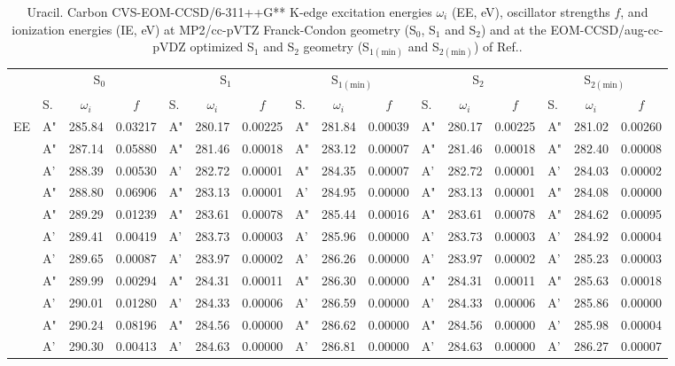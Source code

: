 \documentclass[journal=jctcce,manuscript=article]{achemso}
\begin{document}
\begin{table}
\caption{Uracil.  Carbon CVS-EOM-CCSD/6-311++G** K-edge excitation energies $\omega_i$ (EE, eV), oscillator strengths $f$, and ionization energies (IE, eV) at MP2/cc-pVTZ Franck-Condon geometry (S$_0$, S$_1$ and S$_2$) and at the EOM-CCSD/aug-cc-pVDZ optimized S$_1$ and S$_2$ geometry (S$_{1(\text{min})}$ and S$_{2(\text{min})}$) of Ref..
\label{Tab:Uracil}}
\scriptsize
\begin{tabular}{l|lcc|lcc|lcc|lcc|lcc}
\cline{2-16}
& \multicolumn{3}{c|}{S$_0$}
& \multicolumn{3}{c|}{S$_1$}  
& \multicolumn{3}{c|}{S$_{1(\text{min})}$}
& \multicolumn{3}{c|}{S$_2$}
& \multicolumn{3}{c}{S$_{2(\text{min})}$}
\\
\cline{2-16}
& S. & $\omega_i$ & $f$ 
& S. & $\omega_i$ & $f$ 
& S. & $\omega_i$ & $f$ 
& S. & $\omega_i$ & $f$ 
& S. & $\omega_i$ & $f$\\
\hline
  EE 
& A" & 285.84 & 0.03217 & A" & 280.17 & 0.00225 & A" & 281.84 & 0.00039 & A" & 280.17 & 0.00225 & A" & 281.02 & 0.00260 \\
& A" & 287.14 & 0.05880 & A" & 281.46 & 0.00018 & A" & 283.12 & 0.00007 & A" & 281.46 & 0.00018 & A" & 282.40 & 0.00008 \\
& A' & 288.39 & 0.00530 & A' & 282.72 & 0.00001 & A" & 284.35 & 0.00007 & A' & 282.72 & 0.00001 & A' & 284.03 & 0.00002 \\
& A" & 288.80 & 0.06906 & A" & 283.13 & 0.00001 & A' & 284.95 & 0.00000 & A" & 283.13 & 0.00001 & A" & 284.08 & 0.00000 \\
& A" & 289.29 & 0.01239 & A" & 283.61 & 0.00078 & A" & 285.44 & 0.00016 & A" & 283.61 & 0.00078 & A" & 284.62 & 0.00095 \\
& A' & 289.41 & 0.00419 & A' & 283.73 & 0.00003 & A' & 285.96 & 0.00000 & A' & 283.73 & 0.00003 & A' & 284.92 & 0.00004 \\
& A' & 289.65 & 0.00087 & A' & 283.97 & 0.00002 & A' & 286.26 & 0.00000 & A' & 283.97 & 0.00002 & A' & 285.23 & 0.00003 \\
& A" & 289.99 & 0.00294 & A" & 284.31 & 0.00011 & A" & 286.30 & 0.00000 & A" & 284.31 & 0.00011 & A" & 285.63 & 0.00018 \\
& A' & 290.01 & 0.01280 & A' & 284.33 & 0.00006 & A' & 286.59 & 0.00000 & A' & 284.33 & 0.00006 & A' & 285.86 & 0.00000 \\
& A" & 290.24 & 0.08196 & A" & 284.56 & 0.00000 & A" & 286.62 & 0.00000 & A" & 284.56 & 0.00000 & A' & 285.98 & 0.00004 \\
& A' & 290.30 & 0.00413 & A' & 284.63 & 0.00000 & A' & 286.81 & 0.00000 & A' & 284.63 & 0.00000 & A' & 286.27 & 0.00007 \\

\end{tabular}
\end{table}
\end{document}
